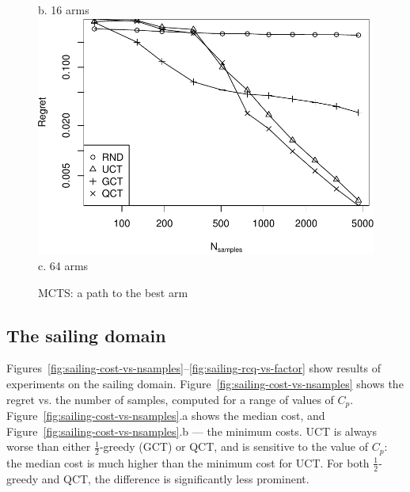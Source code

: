 \documentclass{article}
\begin{document}
\begin{figure}
\begin{minipage}[c]{0.5\linewidth}
    b. 16 arms \\
    \vspace{1em}
    \includegraphics[scale=0.4]{tree-identity-k=64-uqb=8.pdf} \\
    c. 64 arms
 \end{minipage}
  \label{fig:mcts-regret}
  \caption{MCTS: a path to the best arm}
\end{figure}

\subsection{The sailing domain}
\label{seq:emp-sailing}

Figures~\ref{fig:sailing-cost-vs-nsamples}--\ref{fig:sailing-rcq-vs-factor}
show results of experiments on the sailing
domain. Figure~\ref{fig:sailing-cost-vs-nsamples} shows the regret
vs. the number of samples, computed for a range of values of
$C_p$. Figure~\ref{fig:sailing-cost-vs-nsamples}.a shows the median
cost, and Figure~\ref{fig:sailing-cost-vs-nsamples}.b --- the minimum
costs. UCT is always worse than either $\frac 1 2$-greedy (GCT) or QCT, and is sensitive to
the value of $C_p$: the median cost is much higher than the minimum
cost for UCT. For both $\frac 1 2$-greedy and QCT, the difference is
significantly less prominent.
\end{document}
